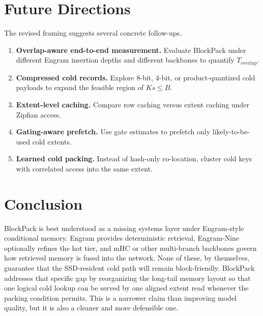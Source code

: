 \documentclass[11pt]{article}
\begin{document}
\section{Future Directions}
The revised framing suggests several concrete follow-ups.
\begin{enumerate}[leftmargin=1.5em]
    \item \textbf{Overlap-aware end-to-end measurement.} Evaluate BlockPack under different Engram insertion depths and different backbones to quantify $T_{\mathrm{overlap}}$.
    \item \textbf{Compressed cold records.} Explore 8-bit, 4-bit, or product-quantized cold payloads to expand the feasible region of $Ks \leq B$.
    \item \textbf{Extent-level caching.} Compare row caching versus extent caching under Zipfian access.
    \item \textbf{Gating-aware prefetch.} Use gate estimates to prefetch only likely-to-be-used cold extents.
    \item \textbf{Learned cold packing.} Instead of hash-only co-location, cluster cold keys with correlated access into the same extent.
\end{enumerate}

\section{Conclusion}
BlockPack is best understood as a missing systems layer under Engram-style conditional memory. Engram provides deterministic retrieval, Engram-Nine optionally refines the hot tier, and mHC or other multi-branch backbones govern how retrieved memory is fused into the network. None of these, by themselves, guarantee that the SSD-resident cold path will remain block-friendly. BlockPack addresses that specific gap by reorganizing the long-tail memory layout so that one logical cold lookup can be served by one aligned extent read whenever the packing condition permits. This is a narrower claim than improving model quality, but it is also a cleaner and more defensible one.
\end{document}
